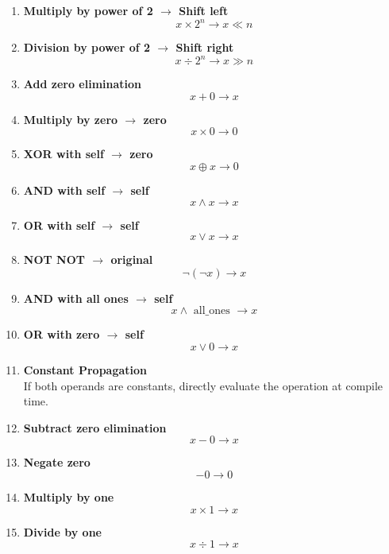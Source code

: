 \documentclass[conference]{IEEEtran}
\begin{document}
\begin{enumerate}
	\item \textbf { Multiply by power of 2 $\rightarrow$ Shift left }
	      \[x \times 2 ^ n \rightarrow x \ll n
	      \]

	\item \textbf {
		      Division by power of 2 $\rightarrow$ Shift right
	      }
	      \[x \div 2 ^ n \rightarrow x \gg n
	      \]

	\item \textbf {
		      Add zero elimination
	      }
	      \[x + 0 \rightarrow x
	      \]

	\item \textbf {
		      Multiply by zero $\rightarrow$ zero
	      }
	      \[x \times 0 \rightarrow 0
	      \]

	\item \textbf {
		      XOR with self $\rightarrow$ zero
	      }
	      \[x \oplus x \rightarrow 0
	      \]

	\item \textbf {
		      AND with self $\rightarrow$ self
	      }
	      \[x \land x \rightarrow x
	      \]

	\item \textbf {
		      OR with self $\rightarrow$ self
	      }
	      \[x \lor x \rightarrow x
	      \]

	\item \textbf {
		      NOT NOT $\rightarrow$ original
	      }
	      \[
		      \neg(\neg x) \rightarrow x
	      \]

	\item \textbf {
		      AND with all ones $\rightarrow$ self
	      }
	      \[x \land \text { all\_ones } \rightarrow x
	      \]

	\item \textbf {
		      OR with zero $\rightarrow$ self
	      }
	      \[x \lor 0 \rightarrow x
	      \]

	\item \textbf {
		      Constant Propagation\\
	      }
	      If both operands are constants, directly evaluate the operation at compile time.

	\item \textbf {
		      Subtract zero elimination
	      }
	      \[x - 0 \rightarrow x
	      \]

	\item \textbf {
		      Negate zero
	      }
	      \[-0 \rightarrow 0
	      \]

	\item \textbf {
		      Multiply by one
	      }
	      \[x \times 1 \rightarrow x
	      \]

	\item \textbf {
		      Divide by one
	      }
	      \[x \div 1 \rightarrow x
	      \]
\end{enumerate}
\end{document}
